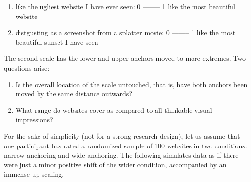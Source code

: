 \documentclass[]{svmono}
\providecommand{\tightlist}{%
  \setlength{\itemsep}{0pt}\setlength{\parskip}{0pt}}
\begin{document}
\begin{enumerate}
\def\labelenumi{\arabic{enumi}.}
\tightlist
\item
  like the ugliest website I have ever seen: 0 -------- 1 like the most
  beautiful website
\item
  distgusting as a screenshot from a splatter movie: 0 -------- 1 like
  the most beautiful sunset I have seen
\end{enumerate}

The second scale has the lower and upper anchors moved to more extremes.
Two questions arise:

\begin{enumerate}
\def\labelenumi{\arabic{enumi}.}
\tightlist
\item
  Is the overall location of the scale untouched, that is, have both
  anchors been moved by the same distance outwards?
\item
  What range do websites cover as compared to all thinkable visual
  impressions?
\end{enumerate}

For the sake of simplicity (not for a strong research design), let us
assume that one participant has rated a randomized sample of 100
websites in two conditions: narrow anchoring and wide anchoring. The
following simulates data as if there were just a minor positive shift of
the wider condition, accompanied by an immense up-scaling.
\end{document}
